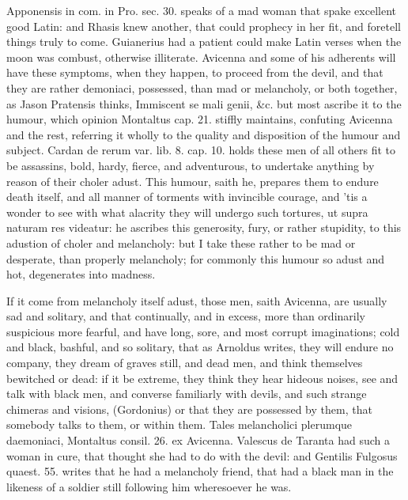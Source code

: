 {Apponensis in com. in Pro. sec. 30. speaks of a mad woman that spake
excellent good Latin: and Rhasis knew another, that could prophecy in
her fit, and foretell things truly to come. Guianerius had a
patient could make Latin verses when the moon was combust, otherwise
illiterate. Avicenna and some of his adherents will have these
symptoms, when they happen, to proceed from the devil, and that they
are rather demoniaci, possessed, than mad or melancholy, or both
together, as Jason Pratensis thinks, Immiscent se mali genii, \&c. but
most ascribe it to the humour, which opinion Montaltus cap. 21. stiffly
maintains, confuting Avicenna and the rest, referring it wholly to the
quality and disposition of the humour and subject. Cardan de rerum var.
lib. 8. cap. 10. holds these men of all others fit to be assassins,
bold, hardy, fierce, and adventurous, to undertake anything by reason
of their choler adust. This humour, saith he, prepares them to
endure death itself, and all manner of torments with invincible
courage, and 'tis a wonder to see with what alacrity they will undergo
such tortures, ut supra naturam res videatur: he ascribes this
generosity, fury, or rather stupidity, to this adustion of choler and
melancholy: but I take these rather to be mad or desperate, than
properly melancholy; for commonly this humour so adust and hot,
degenerates into madness.

If it come from melancholy itself adust, those men, saith Avicenna,
 are usually sad and solitary, and that continually, and in
excess, more than ordinarily suspicious more fearful, and have long,
sore, and most corrupt imaginations; cold and black, bashful, and so
solitary, that as Arnoldus writes, they will endure no company,
they dream of graves still, and dead men, and think themselves
bewitched or dead: if it be extreme, they think they hear hideous
noises, see and talk with black men, and converse familiarly with
devils, and such strange chimeras and visions, (Gordonius) or that they
are possessed by them, that somebody talks to them, or within them.
Tales melancholici plerumque daemoniaci, Montaltus consil. 26. ex
Avicenna. Valescus de Taranta had such a woman in cure, that
thought she had to do with the devil: and Gentilis Fulgosus quaest. 55.
writes that he had a melancholy friend, that  had a black man in
the likeness of a soldier still following him wheresoever he was.

}
